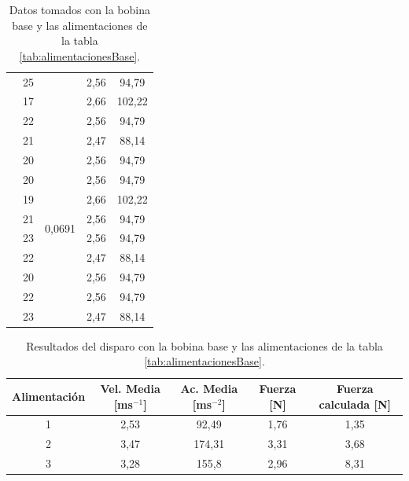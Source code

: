 \begin{table}[H]
\begin{tabular}{|c|c|c|c|c|}
                        & 25     &                          & 2,56      & 94,79       \\
                        & 17     &                          & 2,66      & 102,22      \\
                        & 22     &                          & 2,56      & 94,79       \\
    \hdashline[2pt/5pt]
    \multirow{10}{*}{3} & 21     & \multirow{10}{*}{0,0691} & 2,47      & 88,14       \\
                        & 20     &                          & 2,56      & 94,79       \\
                        & 20     &                          & 2,56      & 94,79       \\
                        & 19     &                          & 2,66      & 102,22      \\
                        & 21     &                          & 2,56      & 94,79       \\
                        & 23     &                          & 2,56      & 94,79       \\
                        & 22     &                          & 2,47      & 88,14       \\
                        & 20     &                          & 2,56      & 94,79       \\
                        & 22     &                          & 2,56      & 94,79       \\
                        & 23     &                          & 2,47      & 88,14       \\
    \hline
    \end{tabular}
    \caption{Datos tomados con la bobina base y las alimentaciones de la tabla \ref{tab:alimentacionesBase}.}
    \label{tab:datosBase}
\end{table}

\begin{table}[H]
    \centering
    \setlength{\tabcolsep}{5pt}
    \renewcommand{\arraystretch}{1.2}
    \begin{tabular}{|c|c|c|c|c|}
        \hline
        \textbf{Alimentación} & \textbf{Vel. Media [ms\(^{-1}\)]} & \textbf{Ac. Media [ms\(^{-2}\)]} & \textbf{Fuerza [N]} & \textbf{Fuerza calculada [N]}\\
        \hline
        1 & 2,53 & 92,49 & 1,76 &  1,35\\
        2 & 3,47 & 174,31 & 3,31 & 3,68\\
        3 & 3,28 & 155,8 & 2,96 &  8,31\\
        \hline
    \end{tabular}
    \caption{Resultados del disparo con la bobina base y las alimentaciones de la tabla \ref{tab:alimentacionesBase}.}
    \label{tab:resultadosBase}
\end{table}
\restoregeometry

